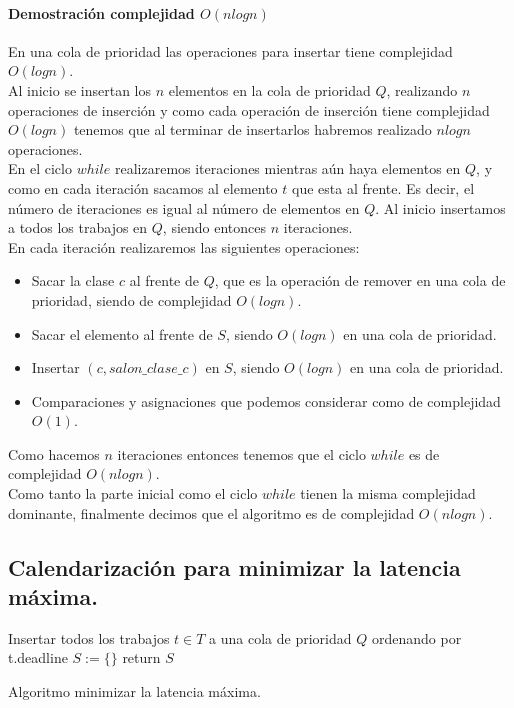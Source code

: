 \documentclass[12pt]{article}
\begin{document}
\paragraph{Demostración complejidad $O(nlogn)$}
En una cola de prioridad las operaciones para insertar tiene complejidad $O(logn)$.\\
Al inicio se insertan los $n$ elementos en la cola de prioridad $Q$, realizando $n$ operaciones de inserción y como cada operación de inserción tiene complejidad $O(logn)$ tenemos que al terminar de insertarlos habremos realizado $nlogn$ operaciones.\\
En el ciclo $while$ realizaremos iteraciones mientras aún haya elementos en $Q$, y como en cada iteración sacamos al elemento $t$ que esta al frente. Es decir, el número de iteraciones es igual al número de elementos en $Q$. Al inicio insertamos a todos los trabajos en $Q$, siendo entonces $n$ iteraciones.\\
En cada iteración realizaremos las siguientes operaciones:\\
\begin{itemize}
	\item Sacar la clase $c$ al frente de $Q$, que es la operación de remover en una cola de prioridad, siendo de complejidad $O(logn)$.
	\item Sacar el elemento al frente de $S$, siendo $O(logn)$ en una cola de prioridad.
	\item Insertar $(c, salon\_clase\_c)$ en $S$, siendo $O(logn)$ en una cola de prioridad.
	\item Comparaciones y asignaciones que podemos considerar como de complejidad $O(1)$.
\end{itemize}
Como hacemos $n$ iteraciones entonces tenemos que el ciclo $while$ es de complejidad $O(nlogn)$. \\
Como tanto la parte inicial como el ciclo $while$ tienen la misma complejidad dominante, finalmente decimos que el algoritmo es de complejidad $O(nlogn)$.\\
\subsection{Calendarización para minimizar la latencia máxima.}
\begin{algorithm}[H]\small
	\SetAlgoLined
	Insertar todos los trabajos $t \in T$ a una cola de prioridad $Q$ ordenando por t.deadline\;
	$S:=\{\}$\;
	return $S$\;
	\caption{Algoritmo minimizar la latencia máxima.}
\end{algorithm}
\end{document}
